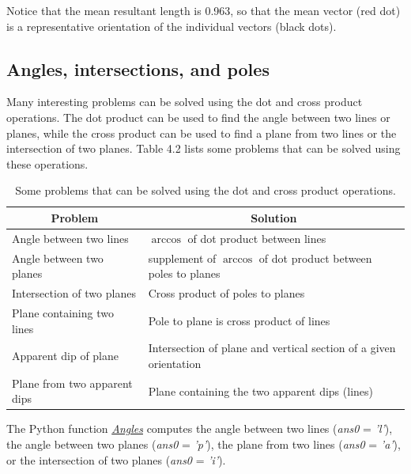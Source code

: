 \documentclass[a4paper , 12pt]{book}
\begin{document}
Notice that the mean resultant length is 0.963, so that the mean vector (red dot) is a representative orientation of the individual vectors (black dots).

\subsection{Angles, intersections, and poles}

Many interesting problems can be solved using the dot and cross product operations. The dot product can be used to find the angle between two lines or planes, while the cross product can be used to find a plane from two lines or the intersection of two planes. Table 4.2 lists some problems that can be solved using these operations.

\begin{table}[h!]
\small
\centering
\begin{tabular}{ | p{6cm} | p{6cm} | } 
 \hline
 \multicolumn{1}{|c|}{Problem} & \multicolumn{1}{|c|}{Solution}  \\
 \hline
 Angle between two lines & $\arccos$ of dot product between lines \\
 \hline
 Angle between two planes & supplement of $\arccos$ of dot product between poles to planes \\
 \hline
 Intersection of two planes & Cross product of poles to planes \\
 \hline
 Plane containing two lines & Pole to plane is cross product of lines \\
 \hline
 Apparent dip of plane & Intersection of plane and vertical section of a given orientation \\
 \hline
 Plane from two apparent dips & Plane containing the two apparent dips (lines) \\
 \hline
\end{tabular}
\caption{Some problems that can be solved using the dot and cross product operations.}
\label{table4.2}
\end{table}

The Python function \href{http://github.com}{\textit{Angles}} computes the angle between two lines (\textit{ans0} = \textit{'l'}), the angle between two planes (\textit{ans0} = \textit{'p'}), the plane from two lines (\textit{ans0} = \textit{'a'}), or the intersection of two planes (\textit{ans0} = \textit{'i'}).
\end{document}
